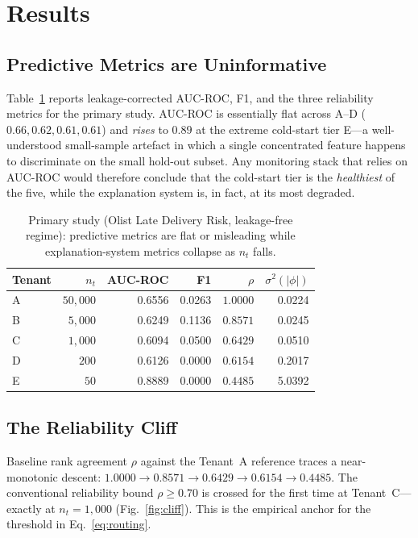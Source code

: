 \documentclass[conference]{IEEEtran}
\newcommand{\auc}{AUC\nobreakdash-ROC}
\newcommand{\nT}{n_t}
\begin{document}
\section{Results}
\label{sec:results}

\subsection{Predictive Metrics are Uninformative}
Table~\ref{tab:primary-metrics} reports leakage-corrected \auc{}, F1, and
the three reliability metrics for the primary study. \auc{} is essentially
flat across A--D ($0.66, 0.62, 0.61, 0.61$) and \emph{rises} to $0.89$ at
the extreme cold-start tier E---a well-understood small-sample artefact in
which a single concentrated feature happens to discriminate on the small
hold-out subset. Any monitoring stack that relies on \auc{} would
therefore conclude that the cold-start tier is the \emph{healthiest} of
the five, while the explanation system is, in fact, at its most
degraded.

\begin{table}[t]
\centering
\caption{Primary study (Olist Late Delivery Risk, leakage-free regime):
predictive metrics are flat or misleading while explanation-system
metrics collapse as $\nT$ falls.}
\label{tab:primary-metrics}
\begin{tabular}{lrrrrr}
\toprule
Tenant & $\nT$ & \auc{} & F1 & $\rho$ & $\sigma^2(|\phi|)$ \\
\midrule
A & $50{,}000$ & 0.6556 & 0.0263 & $1.0000$ & 0.0224 \\
B & $5{,}000$  & 0.6249 & 0.1136 & $0.8571$ & 0.0245 \\
C & $1{,}000$  & 0.6094 & 0.0500 & $0.6429$ & 0.0510 \\
D & $200$      & 0.6126 & 0.0000 & $0.6154$ & 0.2017 \\
E & $50$       & 0.8889 & 0.0000 & $0.4485$ & 5.0392 \\
\bottomrule
\end{tabular}
\end{table}

\subsection{The Reliability Cliff}
Baseline rank agreement $\rho$ against the Tenant~A reference traces a
near-monotonic descent: $1.0000 \to 0.8571 \to 0.6429 \to 0.6154 \to
0.4485$. The conventional reliability bound $\rho \ge 0.70$ is crossed
for the first time at Tenant~C---exactly at $\nT = 1{,}000$
(Fig.~\ref{fig:cliff}). This is the empirical anchor for the threshold in
Eq.~\ref{eq:routing}.
\end{document}
